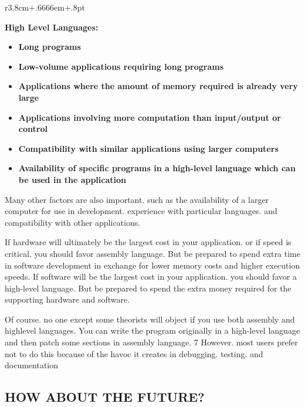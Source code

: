 \documentclass{book}
\begin{document}
\begin{wrapfigure}{r}{3.8cm+.6666em+.8pt}
\end{wrapfigure}
\textbf{High Level Languages:}
\begin{itemize}
\item\textbf{Long programs}
\item\textbf{Low-volume applications requiring long programs}
\item\textbf{Applications where the amount of memory required is already very large}
\item\textbf{Applications involving more computation than input/output or control}
\item\textbf{Compatibility with similar applications using larger computers}
\item\textbf{Availability of specific programs in a high-level language which can be used in the application}
\end{itemize}

Many other factors are also important. such as the availability of a larger computer for use in development. experience with particular languages. and compatibility with other applications.

If hardware will ultimately be the largest cost in your application. or if speed is critical. you should favor assembly language. But be prepared to spend extra time in software development in exchange for lower memory costs and higher execution speeds. If software will be the largest cost in your application. you should favor a high-level language. But be prepared to spend the extra money required for the supporting hardware and software.

Of course. no one except some theorists will object if you use both assembly and highlevel languages. You can write the program originally in a high-level language and then patch some sections in assembly language. 7 However. most users prefer not to do this because of the havoc it creates in debugging. testing. and documentation

\subsection*{HOW ABOUT THE FUTURE?}
\end{document}
